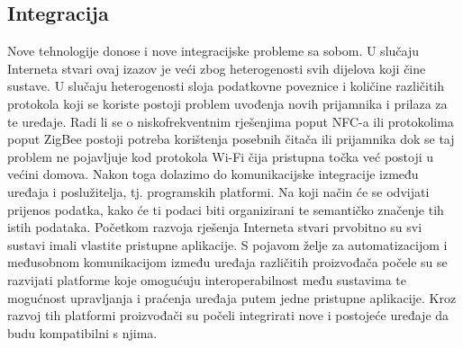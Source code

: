 \documentclass[times, utf8, diplomski]{fer}
\begin{document}
\subsection{Integracija}
Nove tehnologije donose i nove integracijske probleme sa sobom. U slučaju Interneta stvari ovaj izazov je veći zbog heterogenosti svih dijelova koji čine sustave. U slučaju heterogenosti sloja podatkovne poveznice i količine različitih protokola koji se koriste postoji problem uvođenja novih prijamnika i prilaza za te uređaje. Radi li se o niskofrekventnim rješenjima poput NFC-a ili protokolima poput ZigBee postoji potreba korištenja posebnih čitača ili prijamnika dok se taj problem ne pojavljuje kod protokola Wi-Fi čija pristupna točka već postoji u većini domova. Nakon toga dolazimo do komunikacijske integracije između uređaja i poslužitelja, tj. programskih platformi. Na koji način će se odvijati prijenos podatka, kako će ti podaci biti organizirani te semantičko značenje tih istih podataka. Početkom razvoja rješenja Interneta stvari prvobitno su svi sustavi imali vlastite pristupne aplikacije. S pojavom želje za automatizacijom i međusobnom komunikacijom između uređaja različitih proizvođača počele su se razvijati platforme koje omogućuju interoperabilnost među sustavima te mogućnost upravljanja i praćenja uređaja putem jedne pristupne aplikacije. Kroz razvoj tih platformi proizvođači su počeli integrirati nove i postojeće uređaje da budu kompatibilni s njima.
\end{document}
